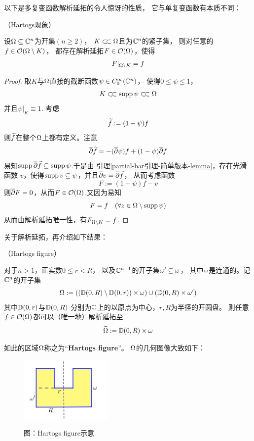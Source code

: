 以下是多复变函数解析延拓的令人惊讶的性质，
它与单复变函数有本质不同：

\begin{thm}（Hartogs现象）

设$\Omega\subseteq\mathbb{C}^n$为开集$(n\geq 2)$，
$K\subset\!\subset\Omega$且为$\mathbb{C}^n$的紧子集，
则对任意的$f\in\mathcal{O}(\Omega\setminus K)$，
都存在解析延拓$F\in\mathcal{O}(\Omega)$，使得
$$F|_{\Omega\setminus K}=f$$
\end{thm}

\begin{proof}
取$K$与$\Omega$直接的截断函数$\psi\in C^\infty_0(\mathbb{C}^n)$，
使得$0\leq \psi\leq 1$，
$$K\subset\!\subset\operatorname{supp}\psi\subset\!\subset\Omega$$
并且$\psi|_K\equiv 1$.
考虑$$\widetilde{f}:=(1-\psi)f$$
则$\widetilde{f}$在整个$\Omega$上都有定义。注意
$$\overline{\partial}\widetilde{f}=-(\overline{\partial}\psi)f+(1-\psi)\overline{\partial} f$$
易知$\operatorname{supp}\overline{\partial}\widetilde{f}\subseteq\operatorname{supp}\psi$.于是由
引理\ref{partial-bar引理-简单版本-lemma}，存在光滑函数
$v$，使得$\operatorname{supp} v\subseteq\psi$，并且$\overline{\partial} v=\overline{\partial}\widetilde{f}$，
从而考虑函数
$$F:=(1-\psi)f-v$$
则$\overline{\partial} F=0$，从而$F\in\mathcal{O}(\Omega)$.又因为易知
$$F=f\quad(\forall z\in\Omega\setminus\operatorname{supp}\psi)$$
从而由解析延拓唯一性，有$F_{\Omega\setminus K}=f$.
\end{proof}

关于解析延拓，再介绍如下结果：

\begin{lemma}（Hartogs figure）

对于$n>1$，正实数$0\leq r<R$，
以及$\mathbb{C}^{n-1}$的开子集$\omega'\subseteq\omega$，
其中$\omega$是连通的。记$\mathbb{C}^n$的开子集
$$
  \Omega:=
    \left(
      (\mathbb{D}(0,R)\setminus\mathbb{D}(0,r))\times\omega
    \right)
    \cup
    \left(
      \mathbb{D}(0,R)\times\omega'
    \right)
$$
其中$\mathbb{D}(0,r)$与$\mathbb{D}(0,R)$
分别为$\mathbb{C}$上的以原点为中心，$r,R$为半径的开圆盘。
则任意$f\in\mathcal{O}(\Omega)$都可以（唯一地）解析延拓至
$$\widetilde{\Omega}:=\mathbb{D}(0,R)\times\omega$$
\end{lemma}
如此的区域$\Omega$称之为“\textbf{Hartogs figure}”。
$\Omega$的几何图像大致如下：

\begin{figure}[ht]
\centering
\includegraphics[width=0.4\textwidth]
  {figures/HartogsFigure.png}

图：Hartogs figure示意
\end{figure}

